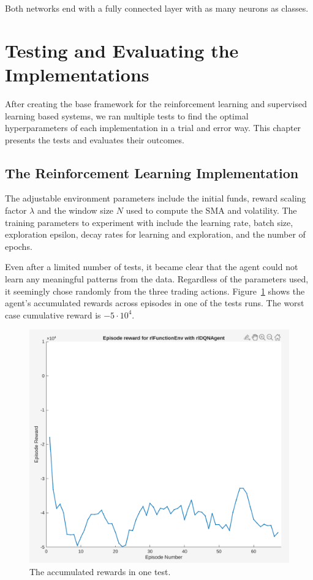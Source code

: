 \documentclass[a4paper,oneside,onecolumn,12pt]{book}
\begin{document}
	Both networks end with a fully connected layer with as many neurons as classes.

\section{Testing and Evaluating the Implementations}
After creating the base framework for the reinforcement learning and supervised learning based systems, we ran multiple tests to find the optimal hyperparameters of each implementation in a trial and error way. This chapter presents the tests and evaluates their outcomes.
	\subsection{The Reinforcement Learning Implementation}
	The adjustable environment parameters include the initial funds, reward scaling factor $\lambda$ and the window size $N$ used to compute the SMA and volatility. The training parameters to experiment with include the learning rate, batch size, exploration epsilon, decay rates for learning and exploration, and the number of epochs.

	Even after a limited number of tests, it became clear that the agent could not learn any meaningful patterns from the data. Regardless of the parameters used, it seemingly chose randomly from the three trading actions. Figure~\ref{fig:rl_episode_rewards} shows the agent's accumulated rewards across episodes in one of the tests runs. The worst case cumulative reward is $-5 \cdot 10^4$.

	\begin{figure}[H]
	\begin{center}
		\includegraphics[width=0.9\linewidth]{kep/RL1_episode_rewards.png}
		\caption{The accumulated rewards in one test.}
		\label{fig:rl_episode_rewards}
	\end{center}
	\end{figure}
\end{document}

